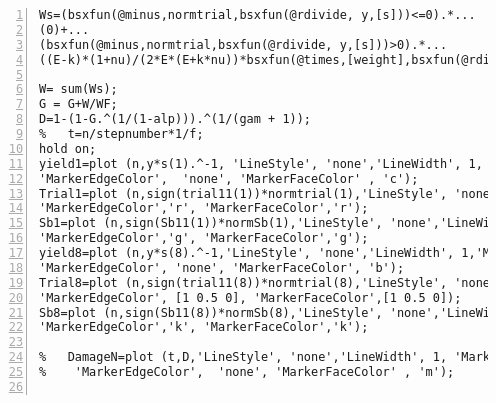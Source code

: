 \begin{lstlisting}[numbers=left, numberstyle=\tiny, keywordstyle=\color{blue!100}, commentstyle=\color{red!30!green!100!blue!100}, frame=shadowbox, rulesepcolor=\color{red!20!green!20!blue!20}]
Ws=(bsxfun(@minus,normtrial,bsxfun(@rdivide, y,[s]))<=0).*...
(0)+...
(bsxfun(@minus,normtrial,bsxfun(@rdivide, y,[s]))>0).*...
((E-k)*(1+nu)/(2*E*(E+k*nu))*bsxfun(@times,[weight],bsxfun(@rdivide,bsxfun(@times,bsxfun(@minus,normtrial,bsxfun(@rdivide, y,[s])),y),[s])));

W= sum(Ws); 
G = G+W/WF;
D=1-(1-G.^(1/(1-alp))).^(1/(gam + 1));
%   t=n/stepnumber*1/f;
hold on;
yield1=plot (n,y*s(1).^-1, 'LineStyle', 'none','LineWidth', 1, 'Marker', 'o', 'MarkerSize', 6, ...
'MarkerEdgeColor',  'none', 'MarkerFaceColor' , 'c');
Trial1=plot (n,sign(trial11(1))*normtrial(1),'LineStyle', 'none','LineWidth', 1,'Marker', '^', 'MarkerSize', 6, ...
'MarkerEdgeColor','r', 'MarkerFaceColor','r');
Sb1=plot (n,sign(Sb11(1))*normSb(1),'LineStyle', 'none','LineWidth', 1,'Marker', 'v', 'MarkerSize', 6, ...
'MarkerEdgeColor','g', 'MarkerFaceColor','g');
yield8=plot (n,y*s(8).^-1,'LineStyle', 'none','LineWidth', 1,'Marker', 'o', 'MarkerSize', 6, ...
'MarkerEdgeColor', 'none', 'MarkerFaceColor', 'b');
Trial8=plot (n,sign(trial11(8))*normtrial(8),'LineStyle', 'none','LineWidth', 1,'Marker', '^', 'MarkerSize', 6, ...
'MarkerEdgeColor', [1 0.5 0], 'MarkerFaceColor',[1 0.5 0]);
Sb8=plot (n,sign(Sb11(8))*normSb(8),'LineStyle', 'none','LineWidth', 1,'Marker', 'v', 'MarkerSize', 6, ...
'MarkerEdgeColor','k', 'MarkerFaceColor','k');

%   DamageN=plot (t,D,'LineStyle', 'none','LineWidth', 1, 'Marker', 'o', 'MarkerSize', 6, ...
%    'MarkerEdgeColor',  'none', 'MarkerFaceColor' , 'm');


\end{lstlisting}
